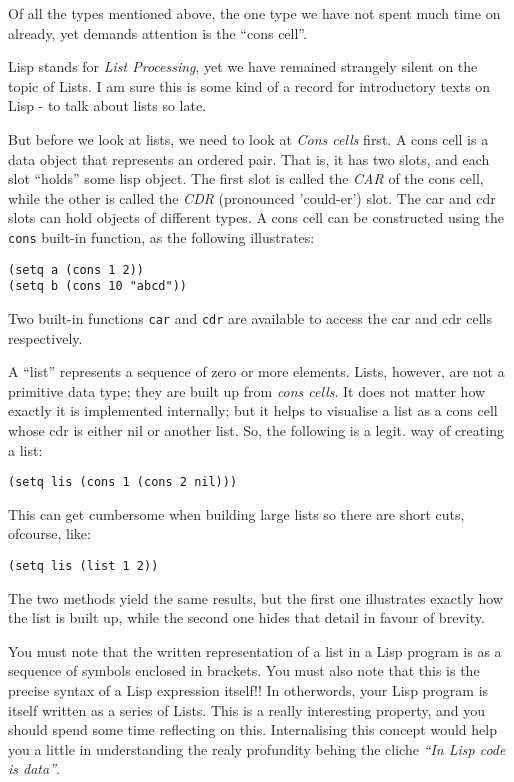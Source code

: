 \documentclass[10pt]{article}
\begin{document}
Of all the types mentioned above, the one type we have not spent much time on
already, yet demands attention is the ``cons cell''.

Lisp stands for \textit{List Processing}, yet we have remained strangely silent
on the topic of Lists.  I am sure this is some kind of a record for
introductory texts on Lisp - to talk about lists so late. 

But before we look at lists, we need to look at \textit{Cons cells} first.  A
cons cell is a data object that represents an ordered pair.  That is, it has
two slots, and each slot ``holds'' some lisp object.  The first slot is called
the \textit{CAR} of the cons cell, while the other is called the \textit{CDR}
(pronounced 'could-er') slot.  The car and cdr slots can hold objects of
different types.  A cons cell can be constructed using the \texttt{cons}
built-in function, as the following illustrates:

\begin{verbatim}
(setq a (cons 1 2))
(setq b (cons 10 "abcd"))
\end{verbatim}

Two built-in functions \texttt{car} and \texttt{cdr} are available to access
the car and cdr cells respectively.

A ``list'' represents a sequence of zero or more elements.  Lists, however, are
not a primitive data type; they are built up from \textit{cons cells}.  It does
not matter how exactly it is implemented internally; but it helps to visualise
a list as a cons cell whose cdr is either nil or another list.  So, the
following is a legit. way of creating a list:

\begin{verbatim}
(setq lis (cons 1 (cons 2 nil)))
\end{verbatim}

This can get cumbersome when building large lists so there are short cuts,
ofcourse, like:

\begin{verbatim}
(setq lis (list 1 2))
\end{verbatim}

The two methods yield the same results, but the first one illustrates exactly
how the list is built up, while the second one hides that detail in favour of
brevity.

You must note that the written representation of a list in a Lisp program is as
a sequence of symbols enclosed in brackets.  You must also note that this is
the precise syntax of a Lisp expression itself!! In otherwords, your Lisp
program is itself written as a series of Lists.  This is a really interesting
property, and you should spend some time reflecting on this.  Internalising
this concept would help you a little in understanding the realy profundity
behing the cliche \textit{``In Lisp code is data''}.
\end{document}
